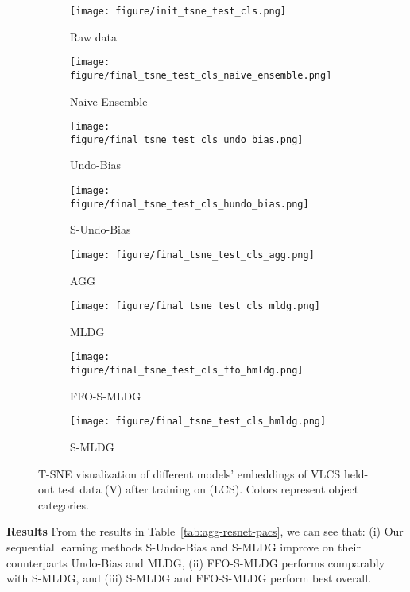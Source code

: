 \documentclass[runningheads]{llncs}
\newcommand{\nameS}{S-MLDG}
\newcommand{\nameFFS}{FFO-\nameS}
\newcommand{\hundo}{S-Undo-Bias}
\newcommand{\keypoint}[1]{\vspace{0.1cm}\noindent\textbf{#1}\quad}
\begin{document}
\begin{figure*}[t]
    \centering
    \begin{subfigure}[b]{0.24\linewidth}
    \centering
    \texttt{[image: figure/init\_tsne\_test\_cls.png]}
\caption{Raw data}
    \end{subfigure}
    \begin{subfigure}[b]{0.24\linewidth}
    \texttt{[image: figure/final\_tsne\_test\_cls\_naive\_ensemble.png]}
\caption{Naive Ensemble}
     \end{subfigure}
     \begin{subfigure}[b]{0.24\linewidth}
    \texttt{[image: figure/final\_tsne\_test\_cls\_undo\_bias.png]}
\caption{Undo-Bias}
     \end{subfigure}
     \begin{subfigure}[b]{0.24\linewidth}
    \texttt{[image: figure/final\_tsne\_test\_cls\_hundo\_bias.png]}
\caption{\hundo{}}
    \end{subfigure}
\begin{subfigure}[b]{0.24\linewidth}
    \texttt{[image: figure/final\_tsne\_test\_cls\_agg.png]}
\caption{AGG}
    \end{subfigure}
    \begin{subfigure}[b]{0.24\linewidth}
    \texttt{[image: figure/final\_tsne\_test\_cls\_mldg.png]}
\caption{MLDG}
    \end{subfigure}
    \begin{subfigure}[b]{0.24\linewidth}
     \texttt{[image: figure/final\_tsne\_test\_cls\_ffo\_hmldg.png]}
\caption{\nameFFS{}}
    \end{subfigure}
    \begin{subfigure}[b]{0.24\linewidth}
    \texttt{[image: figure/final\_tsne\_test\_cls\_hmldg.png]}
\caption{\nameS{}}
    \end{subfigure}
\caption{T-SNE visualization of different models' embeddings of VLCS held-out test data (V) after training on (LCS). Colors represent object categories.}
    \label{fig:hmldg-vs-mldg}
\end{figure*}

\keypoint{Results}
From the results in Table~\ref{tab:agg-resnet-pacs}, we can see that: (i) Our sequential learning methods \hundo{} and \nameS{} improve on their counterparts Undo-Bias and MLDG, (ii) \nameFFS{} performs comparably with \nameS{}, and (iii) \nameS{} and \nameFFS{} perform best overall. 
\end{document}
